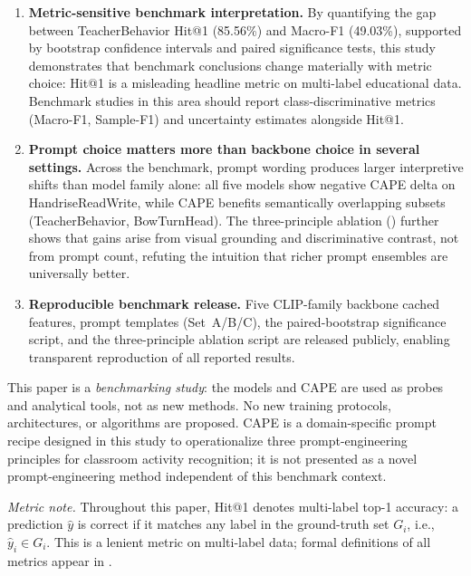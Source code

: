 \documentclass[symmetry,article,submit,pdftex,moreauthors]{Definitions/mdpi}
\begin{document}
\begin{enumerate}
    \item \textbf{Metric-sensitive benchmark interpretation.} By quantifying the gap between TeacherBehavior Hit@1 (85.56\%) and Macro-F1 (49.03\%), supported by bootstrap confidence intervals and paired significance tests, this study demonstrates that benchmark conclusions change materially with metric choice: Hit@1 is a misleading headline metric on multi-label educational data. Benchmark studies in this area should report class-discriminative metrics (Macro-F1, Sample-F1) and uncertainty estimates alongside Hit@1.

    \item \textbf{Prompt choice matters more than backbone choice in several settings.} Across the benchmark, prompt wording produces larger interpretive shifts than model family alone: all five models show negative CAPE delta on HandriseReadWrite, while CAPE benefits semantically overlapping subsets (TeacherBehavior, BowTurnHead). The three-principle ablation () further shows that gains arise from visual grounding and discriminative contrast, not from prompt count, refuting the intuition that richer prompt ensembles are universally better.

    \item \textbf{Reproducible benchmark release.} Five CLIP-family backbone cached features, prompt templates (Set~A/B/C), the paired-bootstrap significance script, and the three-principle ablation script are released publicly, enabling transparent reproduction of all reported results.
\end{enumerate}

\noindent This paper is a \emph{benchmarking study}: the models and CAPE are used as probes and analytical tools, not as new methods. No new training protocols, architectures, or algorithms are proposed. CAPE is a domain-specific prompt recipe designed in this study to operationalize three prompt-engineering principles for classroom activity recognition; it is not presented as a novel prompt-engineering method independent of this benchmark context.

\noindent\textit{Metric note.} Throughout this paper, Hit@1 denotes multi-label top-1 accuracy: a prediction $\hat{y}$ is correct if it matches any label in the ground-truth set $G_i$, i.e., $\hat{y}_i \in G_i$. This is a lenient metric on multi-label data; formal definitions of all metrics appear in .
\end{document}
